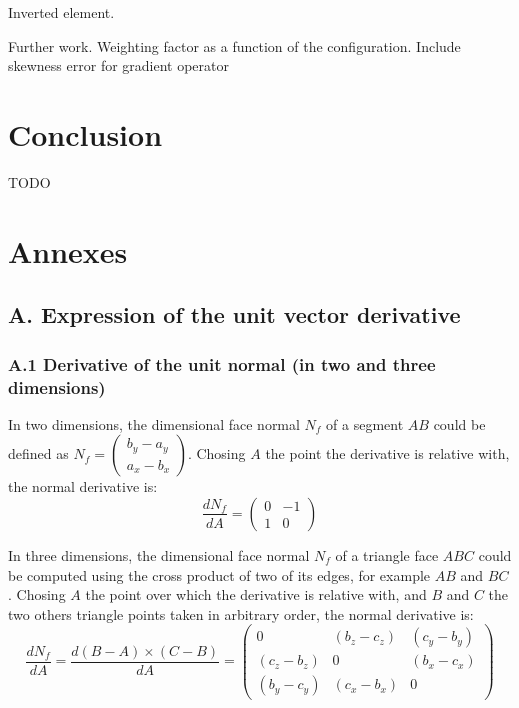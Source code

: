 \documentclass[11pt]{article}
\begin{document}
Inverted element.

Further work.
Weighting factor as a function of the configuration.
Include skewness error for gradient operator


\section{Conclusion}

TODO







\clearpage


\section*{Annexes}

\subsection*{A. Expression of the unit vector derivative}

\subsubsection*{A.1 Derivative of the unit normal (in two and three dimensions)}

In two dimensions, the dimensional face normal $N_f$ of a segment $AB$ could be defined as $
N_f = \begin{pmatrix} b_y - a_y  \\ a_x - b_x \end{pmatrix} $. 
Chosing $A$ the point the derivative is relative with, the normal derivative is:
\begin{equation}
\frac{d N_f}{dA} = \begin{pmatrix}
0 & -1 \\
1 & 0
\end{pmatrix} 
\end{equation}

In three dimensions, the dimensional face normal $N_f$ of a triangle face $ABC$ could be computed using the cross product of two of its edges, for example $AB$ and $BC$.
Chosing $A$ the point over which the derivative is relative with, and $B$ and $C$ the two others triangle points taken in arbitrary order, the normal derivative is:
%
\begin{equation}
\frac{d N_f}{dA} = \frac{d (B-A) \times (C-B)}{dA} = \begin{pmatrix}
0 & (b_z-c_z) & (c_y-b_y) \\
(c_z-b_z) & 0 & (b_x-c_x) \\
(b_y-c_y) & (c_x-b_x) & 0
\end{pmatrix} 
\end{equation}
\end{document}
